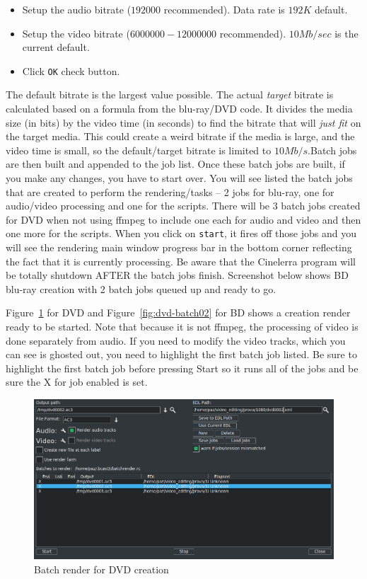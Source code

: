 \begin{itemize}
    \item Setup the audio bitrate ($192000$ recommended).  Data rate is $192K$ default.
    \item Setup the video bitrate ($6000000 - 12000000$ recommended).  $10Mb/sec$ is the current default.
    \item Click \texttt{OK} check button.
\end{itemize}

The default bitrate is the largest value possible.  The actual \textit{target} bitrate is calculated based on a formula from the blu-ray/DVD code.  It divides the media size (in bits)  by the video time (in seconds) to find the bitrate that will \textit{just fit} on the target media.  This could create a weird bitrate if the media is large, and the video time is small, so the default/target bitrate is limited to $10Mb/s$.Batch jobs are then built and appended to the job list.  Once these batch jobs are built, if you make any changes, you have to start over.  You will see listed the batch jobs that are created to perform the rendering/tasks -- 2 jobs for blu-ray, one for audio/video processing and one for the scripts.  There will be 3 batch jobs created for DVD when not using ffmpeg to include one each for audio and video and then one more for the scripts.  When you click on \texttt{start}, it fires off those jobs and you will see the rendering main window progress bar in the bottom corner reflecting the fact that it is currently processing.  Be aware that the Cinelerra program will be totally shutdown AFTER the batch jobs finish.  Screenshot below shows BD blu-ray creation with 2 batch jobs queued up and ready to go.

Figure~\ref{fig:dvd-batch01} for DVD and Figure~\ref{fig:dvd-batch02} for BD shows a creation render ready to be started.  Note that because it is not ffmpeg, the processing of video is done separately from audio.  If you need to modify the video tracks, which you can see is ghosted out, you need to highlight the first batch job listed.  Be sure to highlight the first batch job before pressing Start so it runs all of the jobs and be sure the X for job enabled is set.

\begin{figure}[htpb]
    \centering
    \includegraphics[width=0.8\linewidth]{images/dvd-batch01.png}
    \caption{Batch render for DVD creation}
    \label{fig:dvd-batch01}
\end{figure}

